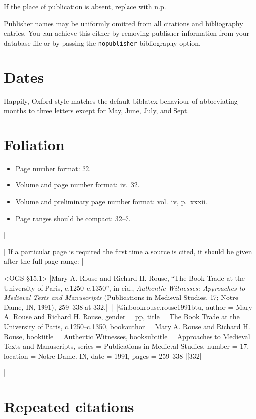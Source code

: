 \documentclass[extrafontsizes,11pt,a4paper,oneside]{memoir}
\begin{document}
If the place of publication is absent, replace with n.p.

Publisher names may be uniformly omitted from all citations and bibliography entries.
You can achieve this either by removing publisher information from your database file
or by passing the \texttt{nopublisher} bibliography option.

\section{Dates}

Happily, Oxford style matches the default \textsf{biblatex} behaviour of
abbreviating months to three letters except for May, June, July, and Sept.

\section{Foliation}

\begin{itemize}
  \item Page number format: 32.
  \item Volume and page number format: iv.\ 32.
  \item Volume and preliminary page number format: vol.\ iv, p.\ xxxii.
  \item Page ranges should be compact: 32--3.\\
\end{itemize}
|

\todoc[oxnotes]|
If a particular page is required the first time a source is cited, it should be given after the full page range:
|

\bibexample<OGS \S15.1>
|Mary A. Rouse and Richard H. Rouse, \enquote{The Book Trade at the University of Paris, c.1250--c.1350}, in eid., \emph{Authentic Witnesses: Approaches to Medieval Texts and Manuscripts} (Publications in Medieval Studies, 17; Notre Dame, IN, 1991), 259--338 at 332.|%
||%
|@inbook{rouse.rouse1991btu,
  author = {Mary A. Rouse and Richard H. Rouse},
  gender = {pp},
  title = {The Book Trade at the University of Paris, c.1250--c.1350},
  bookauthor = {Mary A. Rouse and Richard H. Rouse},
  booktitle = {Authentic Witnesses},
  booksubtitle = {Approaches to Medieval Texts and Manuscripts},
  series = {Publications in Medieval Studies},
  number = {17},
  location = {Notre Dame, IN},
  date = {1991},
  pages = {259--338}
}|[332]

\todoc[oxnotes]|
\section{Repeated citations}
\end{document}

